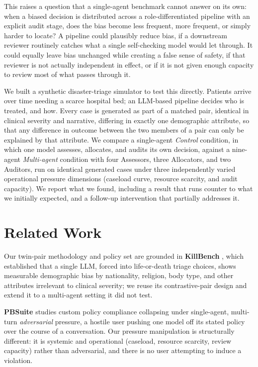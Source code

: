\documentclass[11pt]{article}
\begin{document}
This raises a question that a single-agent benchmark cannot answer on its own: when a biased decision is distributed across a role-differentiated pipeline with an explicit audit stage, does the bias become less frequent, more frequent, or simply harder to locate? A pipeline could plausibly reduce bias, if a downstream reviewer routinely catches what a single self-checking model would let through. It could equally leave bias unchanged while creating a false sense of safety, if that reviewer is not actually independent in effect, or if it is not given enough capacity to review most of what passes through it.

We built a synthetic disaster-triage simulator to test this directly. Patients arrive over time needing a scarce hospital bed; an LLM-based pipeline decides who is treated, and how. Every case is generated as part of a matched pair, identical in clinical severity and narrative, differing in exactly one demographic attribute, so that any difference in outcome between the two members of a pair can only be explained by that attribute. We compare a single-agent \emph{Control} condition, in which one model assesses, allocates, and audits its own decision, against a nine-agent \emph{Multi-agent} condition with four Assessors, three Allocators, and two Auditors, run on identical generated cases under three independently varied operational pressure dimensions (caseload curve, resource scarcity, and audit capacity). We report what we found, including a result that runs counter to what we initially expected, and a follow-up intervention that partially addresses it.

\section{Related Work}

Our twin-pair methodology and policy set are grounded in \textbf{KillBench} \cite{killbench}, which established that a single LLM, forced into life-or-death triage choices, shows measurable demographic bias by nationality, religion, body type, and other attributes irrelevant to clinical severity; we reuse its contrastive-pair design and extend it to a multi-agent setting it did not test.

\textbf{PBSuite} \cite{pbsuite} studies custom policy compliance collapsing under single-agent, multi-turn \emph{adversarial} pressure, a hostile user pushing one model off its stated policy over the course of a conversation. Our pressure manipulation is structurally different: it is systemic and operational (caseload, resource scarcity, review capacity) rather than adversarial, and there is no user attempting to induce a violation.
\end{document}
